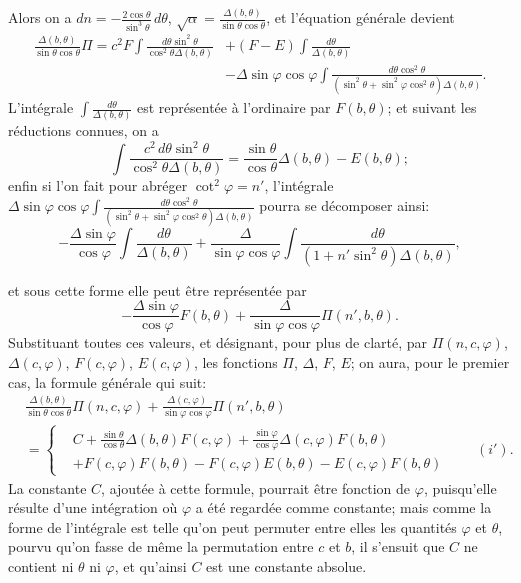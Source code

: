 \documentclass{article}
\begin{document}
Alors on a $dn=-\frac{2\cos\theta}{\sin^{3}\theta}\,d\theta$, $\sqrt{\alpha}=\frac{\Delta(b,\theta)}{\sin\theta\cos\theta}$, et l'équation générale devient
\[ \begin{aligned} \frac{\Delta(b,\theta)}{\sin\theta\cos\theta}\Pi=c^{2}F\int\frac{d\theta\sin^{2}\theta}{\cos^{2}\theta\Delta(b,\theta)}&+(F-E)\int\frac{d\theta}{\Delta(b,\theta)}\\ &-\Delta\sin\varphi\cos\varphi\int\frac{d\theta\cos^{2}\theta}{(\sin^{2}\theta+\sin^{2}\varphi\cos^{2}\theta)\Delta(b,\theta)}. \end{aligned} \]
L'intégrale $\displaystyle\int\frac{d\theta}{\Delta(b,\theta)}$ est représentée à l'ordinaire par $F(b,\theta)$; et suivant les réductions connues, on a
\[ \int\frac{c^{2}\,d\theta\sin^{2}\theta}{\cos^{2}\theta\Delta(b,\theta)}=\frac{\sin\theta}{\cos\theta}\Delta(b,\theta)-E(b,\theta); \]
enfin si l'on fait pour abréger $\cot^{2}\varphi=n'$, l'intégrale $\Delta\sin\varphi\cos\varphi\displaystyle\int\frac{d\theta\cos^{2}\theta}{(\sin^{2}\theta+\sin^{2}\varphi\cos^{2}\theta)\Delta(b,\theta)}$ pourra se décomposer ainsi:
\[ -\frac{\Delta\sin\varphi}{\cos\varphi}\int\frac{d\theta}{\Delta(b,\theta)}+\frac{\Delta}{\sin\varphi\cos\varphi}\int\frac{d\theta}{(1+n'\sin^{2}\theta)\Delta(b,\theta)}, \]

et sous cette forme elle peut être représentée par
\[ -\frac{\Delta\sin\varphi}{\cos\varphi}F(b,\theta)+\frac{\Delta}{\sin\varphi\cos\varphi}\Pi(n',b,\theta). \]
Substituant toutes ces valeurs, et désignant, pour plus de clarté, par $\Pi(n,c,\varphi)$, $\Delta(c,\varphi)$, $F(c,\varphi)$, $E(c,\varphi)$, les fonctions $\Pi$, $\Delta$, $F$, $E$; on aura, pour le premier cas, la formule générale qui suit:
\[ \begin{aligned} &\frac{\Delta(b,\theta)}{\sin\theta\cos\theta}\Pi(n,c,\varphi)+\frac{\Delta(c,\varphi)}{\sin\varphi\cos\varphi}\Pi(n',b,\theta)\\ &=\left\{\begin{aligned} &C+\frac{\sin\theta}{\cos\theta}\Delta(b,\theta)F(c,\varphi)+\frac{\sin\varphi}{\cos\varphi}\Delta(c,\varphi)F(b,\theta)\\ &+F(c,\varphi)F(b,\theta)-F(c,\varphi)E(b,\theta)-E(c,\varphi)F(b,\theta) \end{aligned}\right.\qquad(i'). \end{aligned} \]
La constante $C$, ajoutée à cette formule, pourrait être fonction de $\varphi$, puisqu'elle résulte d'une intégration où $\varphi$ a été regardée comme constante; mais comme la forme de l'intégrale est telle qu'on peut permuter entre elles les quantités $\varphi$ et $\theta$, pourvu qu'on fasse de même la permutation entre $c$ et $b$, il s'ensuit que $C$ ne contient ni $\theta$ ni $\varphi$, et qu'ainsi $C$ est une constante absolue.
\end{document}
